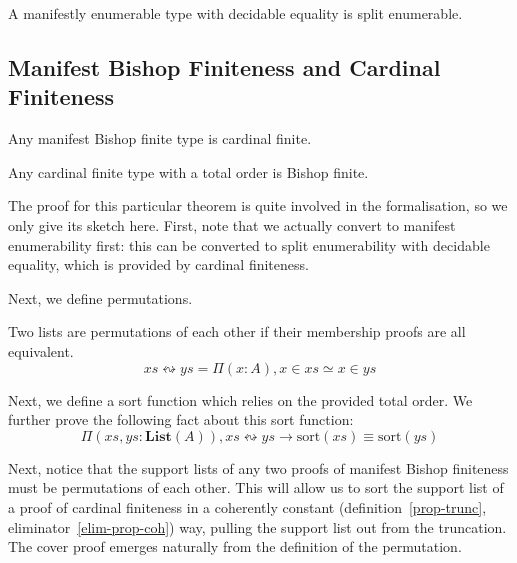 \begin{lemma} \label{manifest-enum-to-split-enum}
  A manifestly enumerable type with decidable equality is split enumerable.
\end{lemma}

\subsection{Manifest Bishop Finiteness and Cardinal Finiteness}
\begin{lemma} \label{manifest-bishop-to-cardinal}
  Any manifest Bishop finite type is cardinal finite.
\end{lemma}
\begin{theorem} \label{cardinal-to-manifest-bishop}
  Any cardinal finite type with a total order is Bishop finite.
\end{theorem}
The proof for this particular theorem is quite involved in the formalisation, so
we only give its sketch here.
First, note that we actually convert to manifest enumerability first: this can
be converted to split enumerability with decidable equality, which is provided
by cardinal finiteness.

Next, we define permutations.
\begin{definition}
  Two lists are permutations of each other if their membership proofs are all
  equivalent\footnotemark \cite{danielssonBagEquivalenceProofRelevant2012}.
  \begin{equation}
    \mathit{xs} \leftrightsquigarrow \mathit{ys} = \Pi {(x : A)} , x \in \mathit{xs} \simeq x \in \mathit{ys}
  \end{equation}
\end{definition}


Next, we define a sort function which relies on the provided total order.
We further prove the following fact about this sort function:
\begin{equation}
  \Pi(\mathit{xs}, \mathit{ys} : \mathbf{List}(A)) , \mathit{xs} \leftrightsquigarrow \mathit{ys} \rightarrow \text{sort}(\mathit{xs}) \equiv \text{sort}(\mathit{ys})
\end{equation}

Next, notice that the support lists of any two proofs of manifest Bishop
finiteness must be permutations of each other.
This will allow us to sort the support list of a proof of cardinal finiteness in
a coherently constant (definition~\ref{prop-trunc},
eliminator~\ref{elim-prop-coh}) way, pulling the support list out from the
truncation.
The cover proof emerges naturally from the definition of the permutation.
